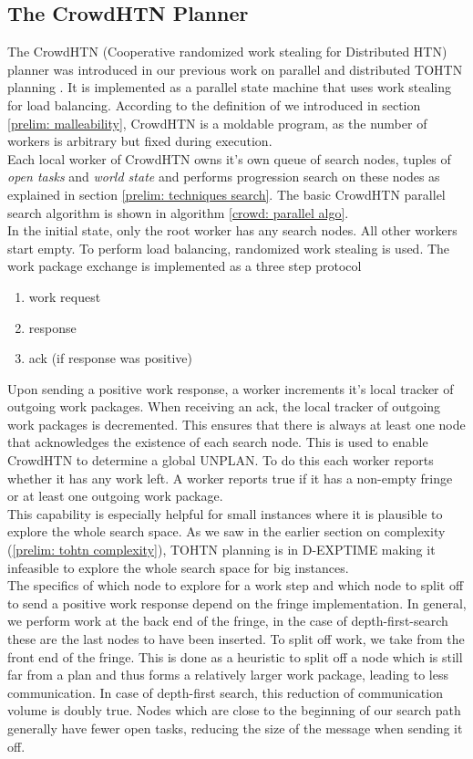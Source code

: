 \subsection{The CrowdHTN Planner}
\label{prelim: crowdhtn}
The CrowdHTN (Cooperative randomized work stealing for Distributed HTN) planner was introduced in our previous work on parallel and distributed TOHTN planning \cite{bretl2021parallel}. It is implemented as a parallel state machine that uses work stealing for load balancing. According to the definition of \cite{feitelson1997job} we introduced in section \ref{prelim: malleability}, CrowdHTN is a moldable program, as the number of workers is arbitrary but fixed during execution. \\
Each local worker of CrowdHTN owns it's own queue of search nodes, tuples of \textit{open tasks} and \textit{world state} and performs progression search on these nodes as explained in section \ref{prelim: techniques search}. The basic CrowdHTN parallel search algorithm is shown in algorithm \ref{crowd: parallel algo}. \\
In the initial state, only the root worker has any search nodes. All other workers start empty. To perform load balancing, randomized work stealing is used. The work package exchange is implemented as a three step protocol
\begin{enumerate}
	\item work request
	\item response
	\item ack (if response was positive)
\end{enumerate}
Upon sending a positive work response, a worker increments it's local tracker of outgoing work packages. When receiving an ack, the local tracker of outgoing work packages is decremented. This ensures that there is always at least one node that acknowledges the existence of each search node. This is used to enable CrowdHTN to determine a global UNPLAN. To do this each worker reports whether it has any work left. A worker reports true if it has a non-empty fringe or at least one outgoing work package. \\
This capability is especially helpful for small instances where it is plausible to explore the whole search space. As we saw in the earlier section on complexity (\ref{prelim: tohtn complexity}), TOHTN planning is in D-EXPTIME making it infeasible to explore the whole search space for big instances.\\
The specifics of which node to explore for a work step and which node to split off to send a positive work response depend on the fringe implementation. In general, we perform work at the back end of the fringe, in the case of depth-first-search these are the last nodes to have been inserted. To split off work, we take from the front end of the fringe. This is done as a heuristic to split off a node which is still far from a plan and thus forms a relatively larger work package, leading to less communication. In case of depth-first search, this reduction of communication volume is doubly true. Nodes which are close to the beginning of our search path generally have fewer open tasks, reducing the size of the message when sending it off.
